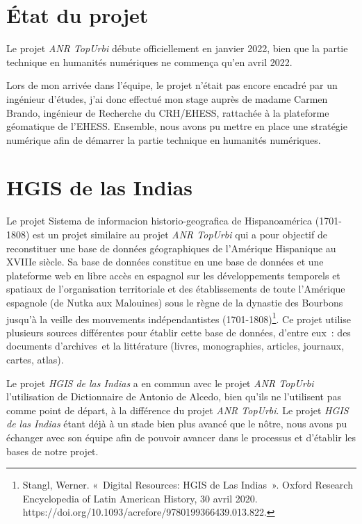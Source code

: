 \documentclass[a4paper,12pt,twoside]{book}
\begin{document}
	\section{État du projet}
	
Le projet \textit{ANR TopUrbi} débute officiellement en janvier 2022, bien que la partie technique en humanités numériques ne commença qu’en avril 2022.

Lors de mon arrivée dans l’équipe, le projet n’était pas encore encadré par un ingénieur d’études, j’ai donc effectué mon stage auprès de madame Carmen Brando, ingénieur de Recherche du \Gls{CRH}/\Gls{EHESS}, rattachée à la plateforme géomatique de l’\Gls{EHESS}. Ensemble, nous avons pu mettre en place une stratégie numérique afin de démarrer la partie technique en humanités numériques.
	
	\section{HGIS de las Indias}
	
Le projet Sistema de informacion historio-geografica de Hispanoamérica (1701-1808) est un projet similaire au projet \textit{ANR TopUrbi} qui a pour objectif de reconstituer une base de données géographiques de l’Amérique Hispanique au XVIIIe siècle. Sa base de données constitue en une base de données et une plateforme web en libre accès en espagnol sur les développements temporels et spatiaux de l'organisation territoriale et des établissements de toute l'Amérique espagnole (de Nutka aux Malouines) sous le règne de la dynastie des Bourbons jusqu’à la veille des mouvements indépendantistes (1701-1808)\footnote{Stangl, Werner. « Digital Resources: HGIS de Las Indias ». Oxford Research Encyclopedia of Latin American History, 30 avril 2020. https://doi.org/10.1093/acrefore/9780199366439.013.822.}. Ce projet utilise plusieurs sources différentes pour établir cette base de données, d’entre eux :  des documents d’archives et la littérature (livres, monographies, articles, journaux, cartes, atlas).

Le projet \textit{HGIS de las Indias} a en commun avec le projet \textit{ANR TopUrbi} l’utilisation de Dictionnaire de Antonio de Alcedo, bien qu’ils ne l’utilisent pas comme point de départ, à la différence du projet \textit{ANR TopUrbi}. Le projet \textit{HGIS de las Indias} étant déjà à un stade bien plus avancé que le nôtre, nous avons pu échanger avec son équipe afin de pouvoir avancer dans le processus et d’établir les bases de notre projet.   
\end{document}
